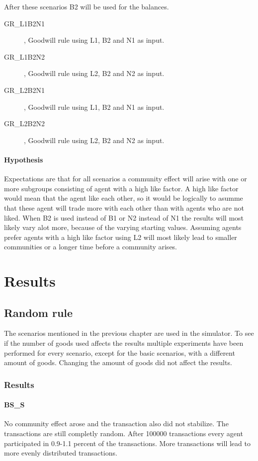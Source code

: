 \documentclass[twoside,openright]{uva-bachelor-thesis}
\begin{document}
After these scenarios B2 will be used for the balances.
\begin{description}
\item[GR\_L1B2N1], Goodwill rule using L1, B2 and N1 as input.
\item[GR\_L1B2N2], Goodwill rule using L2, B2 and N2 as input.
\item[GR\_L2B2N1], Goodwill rule using L1, B2 and N1 as input.
\item[GR\_L2B2N2], Goodwill rule using L2, B2 and N2 as input.
\end{description}

\subsubsection{Hypothesis}
Expectations are that for all scenarios a community effect will arise with one or more subgroups consisting of agent with a high like factor. A high like factor would mean that the agent like each other, so it would be logically to asumme that these agent will trade more with each other than with agents who are not liked. When B2 is used instead of B1 or N2 instead of N1 the results will most likely vary alot more, because of the varying starting values. Assuming agents prefer agents with a high like factor using L2 will most likely lead to smaller communities or a longer time before a community arises.



\chapter{Results}

\section{Random rule}
The scenarios mentioned in the previous chapter are used in the simulator. To see if the number of goods used affects the results multiple experiments have been performed for every scenario, except for the basic scenarios, with a different amount of goods. Changing the amount of goods did not affect the results.
\subsection{Results}

\subsubsection{BS\_S}
No community effect arose and the transaction also did not stabilize. The transactions are still completly random. After 100000 transactions every agent participated in 0.9-1.1 percent of the transactions. More transactions will lead to more evenly distributed transactions.
\end{document}
